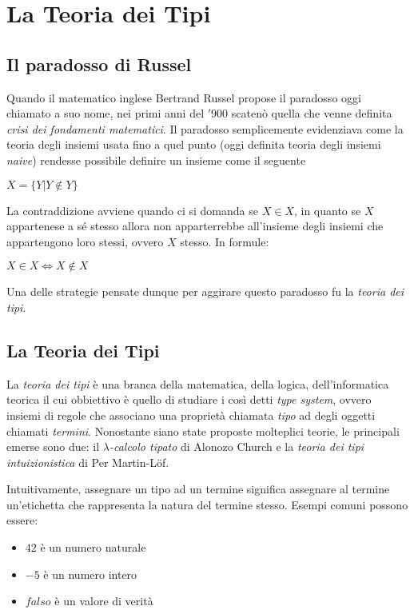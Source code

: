 \documentclass[12pt,a4paper]{report}
\begin{document}
\section{La Teoria dei Tipi}
\subsection{Il paradosso di Russel}
Quando il matematico inglese Bertrand Russel propose il paradosso oggi chiamato a suo 
nome, nei primi anni del $'900$ scatenò quella che venne definita \textit{crisi
dei fondamenti matematici}. Il paradosso semplicemente evidenziava come la teoria
degli insiemi usata fino a quel punto (oggi definita teoria degli insiemi \textit{naive})
rendesse possibile definire un insieme come il seguente
\begin{center}
  $X = \{Y | Y \notin Y \}$
\end{center}

La contraddizione avviene quando ci si domanda se $X \in X$, in quanto se $X$ appartenese
a sé stesso allora non apparterrebbe all'insieme degli insiemi che appartengono loro stessi,
ovvero $X$ stesso. In formule:
\begin{center}
  $X \in X \Leftrightarrow X \notin X$
\end{center}

Una delle strategie pensate dunque per aggirare questo paradosso fu la \textit{teoria dei tipi}.

\subsection{La Teoria dei Tipi}
La \textit{teoria dei tipi} è una branca della matematica, della logica, dell'informatica
teorica il cui obbiettivo è quello di studiare i così detti \textit{type system}, ovvero
insiemi di regole che associano una proprietà chiamata \textit{tipo} ad degli oggetti
chiamati \textit{termini}. Nonostante siano state proposte molteplici teorie, le principali
emerse sono due: il \textit{$\lambda$-calcolo tipato} di Alonozo Church e la \textit{teoria
dei tipi intuizionistica} di Per Martin-L{\"o}f.

Intuitivamente, assegnare un tipo ad un termine significa assegnare al termine un'etichetta
che rappresenta la natura del termine stesso. Esempi comuni possono essere: 
\begin{itemize}
  \item $42$ è un numero naturale 
  \item $-5$ è un numero intero
  \item $falso$ è un valore di verità 
\end{itemize}
\end{document}
